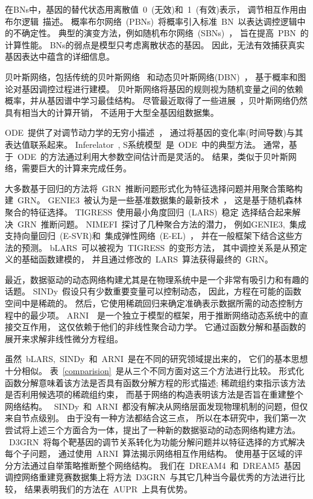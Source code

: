 在BNs中，基因的替代状态用离散值~0~(无效)和~1~(有效)表示，
调节相互作用由布尔逻辑~\cite{kauffman1969homeostasis}描述。
概率布尔网络~(PBNs)~\cite{shmulevich2002probabilistic}将概率引入标准~BN~以表达调控逻辑中的不确定性。
典型的演变方法，例如随机布尔网络~(SBNs)~\cite{liang2012stochastic}，
旨在提高~PBN~的计算性能。
BNs的弱点是模型只考虑离散状态的基因。
因此，无法有效捕获真实基因表达中蕴含的详细信息。

贝叶斯网络，包括传统的贝叶斯网络~\cite{friedman2000using,friedman2003being}
和动态贝叶斯网络(DBN)~\cite{grzegorczyk2010improvements}，
基于概率和图论对基因调控过程进行建模。
贝叶斯网络将基因的规则视为随机变量之间的依赖概率，并从基因谱中学习最佳结构。
尽管最近取得了一些进展~\cite{hill2012bayesian}，贝叶斯网络仍然具有相当大的计算开销，
不适用于大型全基因组数据集。

ODE~提供了对调节动力学的无穷小描述~\cite{chen1999modeling}，
通过将基因的变化率(时间导数)与其表达值联系起来。
Inferelator~\cite{bonneau2006inferelator},
S系统模型~\cite{kikuchi2003dynamic,wang2010inference,liu2012inference}是~ODE~中的典型方法。
通常，基于~ODE~的方法通过利用大参数空间估计而是灵活的。
结果，类似于贝叶斯网络，需要巨大的计算来完成任务。

大多数基于回归的方法将~GRN~推断问题形式化为特征选择问题并用聚合策略构建~GRN。
GENIE3~\cite{huynh2010inferring}被认为是一些基准数据集的最新技术~\cite{marbach2010revealing}，
这是基于随机森林聚合的特征选择。
TIGRESS~\cite{Haury2012}使用最小角度回归~(LARS)~稳定
选择结合起来解决~GRN~推断问题。
NIMEFI~\cite{ruyssinck2014nimefi}探讨了几种聚合方法的潜力，
例如GENIE3,~集成支持向量回归~(E-SVR)和~集成弹性网络~(E-EL)~\cite{zou2005regularization}，
并在一般框架下结合这些方法的预测。
bLARS~\cite{singh2016blars}可以被视为~TIGRESS~的变形方法，
其中调控关系是从预定义的基础函数建模的，
并且通过修改的~LARS~算法获得最终的~GRN。

最近，数据驱动的动态网络构建尤其是在物理系统中是一个非常有吸引力和有趣的话题。
SINDy~\cite{brunton2016discovering}假设只有少数重要变量可以控制动态，
因此，方程在可能的函数空间中是稀疏的。
然后，它使用稀疏回归来确定准确表示数据所需的动态控制方程中的最少项。
ARNI~\cite{casadiego2017model}~是一个独立于模型的框架，用于推断网络动态系统中的直接交互作用，
这仅依赖于他们的非线性聚合动力学。
它通过函数分解和基函数的展开来求解非线性微分方程组。

虽然~bLARS,~SINDy~和~ARNI~是在不同的研究领域提出来的，
它们的基本思想十分相似。
表~\ref{comparision}~是从三个不同方面对这三个方法进行比较。
形式化函数分解意味着该方法是否具有函数分解方程的形式描述;
稀疏组约束指示该方法是否利用候选项的稀疏组约束，
而基于网络的构造表明该方法是否旨在重建整个网络结构。
~SINDy~和~ARNI~都没有解决从网络层面发现物理机制的问题，但仅来自节点级别。
由于没有一种方法都结合​​这三点，
所以在本研究中，我们第一次尝试将上述三个方面合为一体，提出了一种新的数据驱动的动态网络构建方法。
~D3GRN~将每个靶基因的调节关系转化为功能分解问题并以特征选择的方式解决每个子问题，
通过使用~ARNI~算法揭示网络相互作用结构。
使用基于区域的评分方法通过自举策略推断整个网络结构。
我们在~DREAM4~和~DREAM5~基因调控网络重建竞赛数据集上将方法~D3GRN~与其它几种当今最优秀的方法进行比较，
结果表明我们的方法在~AUPR~上具有优势。

